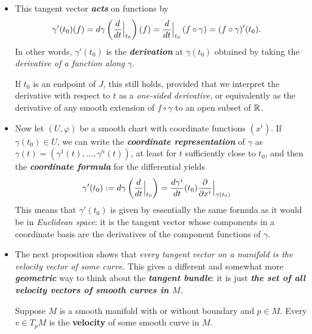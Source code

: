 \documentclass[11pt]{article}
\begin{document}
\begin{itemize}
\item \begin{remark}
This tangent vector \emph{\textbf{acts}} on functions by
\begin{align*}
\gamma'(t_0)(f) &= d\gamma\left(\frac{d}{dt}\Bigr|_{t_0}\right)(f) = \frac{d}{dt}\Bigr|_{t_0}\left(f \circ \gamma\right) = (f \circ \gamma)'(t_0).
\end{align*}
In other words, $\gamma'(t_0)$ is the \emph{\textbf{derivation}} at $\gamma(t_0)$ obtained by taking the \emph{derivative of a function along} $\gamma$. 

If $t_0$ is an endpoint of $J$, this still holds, provided that we interpret the derivative with respect to $t$ as a \emph{one-sided derivative},  or equivalently as the derivative of any smooth extension of $f \circ \gamma$ to an open subset of ${\mathbb R}$.
\end{remark}

\item \begin{remark}
Now let $(U, \varphi)$ be a smooth chart with coordinate functions $(x^i)$. If $\gamma(t_0) \in U$, we can write the \emph{\textbf{coordinate representation}} of $\gamma$ as $\gamma(t) = (\gamma^1(t), \ldots, \gamma^{n}(t))$, at least for $t$ sufficiently close to $t_0$, and then the \textbf{\emph{coordinate formula}} for the differential yields
\begin{align}
\gamma'(t_0) := d\gamma\left(\frac{d}{dt}\Bigr|_{t_0}\right) &= \frac{d\gamma^{i}}{dt}(t_0)\frac{\partial }{ \partial x^{i}}\Bigr|_{\gamma(t_0)} \label{eqn: curve_coordinate}
\end{align} This means that $\gamma'(t_0)$ is given by essentially the same formula as it would be in \emph{Euclidean space}: it is the tangent vector whose components in a coordinate basis are the derivatives of the component functions of $\gamma$.
\end{remark}

\item The next proposition shows that \emph{every tangent vector on a manifold is the velocity vector of some curve}. This gives a different and somewhat more \emph{\textbf{geometric}} way to think about the \emph{\textbf{tangent bundle}}: it is just \emph{\textbf{the set of all velocity vectors of smooth curves in $M$}}.

\begin{proposition}
Suppose $M$ is a smooth manifold with or without boundary and $p \in M$. Every $v \in T_{p}M$ is the \textbf{velocity} of some smooth curve in $M$.
\end{proposition}


\end{itemize}
\end{document}

